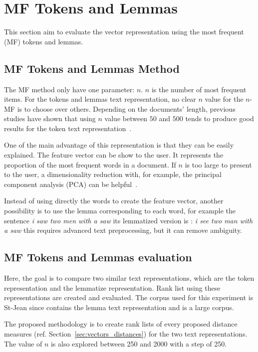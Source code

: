 \section{MF Tokens and Lemmas \label{sec:tokens_lemmas}}

This section aim to evaluate the vector representation using the most frequent (MF) tokens and lemmas.

\subsection{MF Tokens and Lemmas Method}

The MF method only have one parameter: $n$.
$n$ is the number of most frequent items.
For the tokens and lemmas text representation, no clear $n$ value for the $n$-MF is to choose over others.
Depending on the documents' length, previous studies have shown that using $n$ value between $50$ and $500$ tends to produce good results for the token text representation~\cite{savoy_text_representation}.

One of the main advantage of this representation is that they can be easily explained.
The feature vector can be show to the user.
It represents the proportion of the most frequent words in a document.
If $n$ is too large to present to the user, a dimensionality reduction with, for example, the principal component analysis (PCA) can be helpful~\cite{savoy_stylo}.

Instead of using directly the words to create the feature vector, another possibility is to use the lemma corresponding to each word, for example the sentence \textit{i saw two men with a saw} its lemmatized version is : \textit{i see two man with a saw} this requires advanced text preprocessing, but it can remove ambiguity.

\subsection{MF Tokens and Lemmas evaluation \label{sec:tokens_lemmas_eval}}

Here, the goal is to compare two similar text representations, which are the token representation and the lemmatize representation.
Rank list using these representations are created and evaluated.
The corpus used for this experiment is St-Jean since contains the lemma text representation and is a large corpus.

The proposed methodology is to create rank lists of every proposed distance measures (ref. Section~\ref{sec:vectors_distances}) for the two text representations.
The value of $n$ is also explored between 250 and 2000 with a step of 250.

